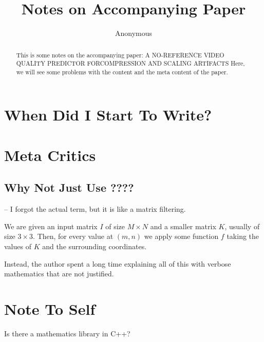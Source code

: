 \documentclass{article}
\title{Notes on Accompanying Paper}
\author{Anonymous}
\begin{document}
\maketitle

\begin{abstract}
    This is some notes on the accompanying paper: A NO-REFERENCE VIDEO QUALITY PREDICTOR FORCOMPRESSION AND SCALING ARTIFACTS
    Here, we will see some problems with the content and the meta content of the paper.
\end{abstract}

\section{When Did I Start To Write?}


\section{Meta Critics}

\subsection{Why Not Just Use ????}

-- I forgot the actual term, but it is like a matrix filtering.

We are given an input matrix $I$ of size $M \times N$ and a smaller matrix $K$, usually of size $3 \times 3$.
Then, for every value at $(m, n)$ we apply some function $f$ taking the values of $K$ and the surrounding coordinates.

Instead, the author spent a long time explaining all of this with verbose mathematics that are not justified.

\section{Note To Self}

Is there a mathematics library in C++?
\end{document}
